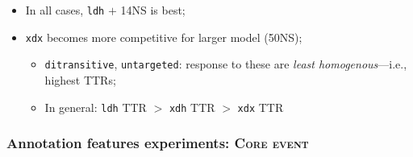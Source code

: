 \documentclass[handout,xcolor={dvipsnames}]{beamer}
\newcommand{\feat}[1]{\textsc{#1}}
\newcommand{\param}[1]{\texttt{#1}}
\begin{document}
\begin{frame}
\begin{itemize}
\item In all cases, \param{ldh} $+$ 14NS is best;
\item \param{xdx} becomes more competitive for larger model (50NS);
\begin{itemize}
\item \param{ditransitive}, \param{untargeted}: response to these are \textit{least homogenous}---i.e., highest TTRs;
\item In general: \param{ldh} TTR $>$ \param{xdh} TTR $>$ \param{xdx} TTR
\end{itemize}
\end{itemize}

\end{frame}

\begin{frame}
\frametitle{Annotation features experiments: \feat{Core event}}


\end{frame}
\end{document}
